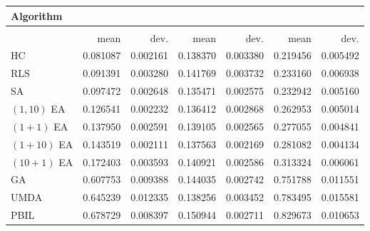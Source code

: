 \begin{tabular}{@{} l *{6}{>{{}}N{1}{2}} @{}}
\toprule
{Algorithm} &  \\
\midrule
&  &  &  \\
\midrule
& {mean} & {dev.} & {mean} & {dev.} & {mean} & {dev.} \\
\midrule
HC & 0.081087 & 0.002161 & 0.138370 & 0.003380 & 0.219456 & 0.005492 \\
RLS & 0.091391 & 0.003280 & 0.141769 & 0.003732 & 0.233160 & 0.006938 \\
SA & 0.097472 & 0.002648 & 0.135471 & 0.002575 & 0.232942 & 0.005160 \\
$(1,10)$ EA & 0.126541 & 0.002232 & 0.136412 & 0.002868 & 0.262953 & 0.005014 \\
$(1+1)$ EA & 0.137950 & 0.002591 & 0.139105 & 0.002565 & 0.277055 & 0.004841 \\
$(1+10)$ EA & 0.143519 & 0.002111 & 0.137563 & 0.002169 & 0.281082 & 0.004134 \\
$(10+1)$ EA & 0.172403 & 0.003593 & 0.140921 & 0.002586 & 0.313324 & 0.006061 \\
GA & 0.607753 & 0.009388 & 0.144035 & 0.002742 & 0.751788 & 0.011551 \\
UMDA & 0.645239 & 0.012335 & 0.138256 & 0.003452 & 0.783495 & 0.015581 \\
PBIL & 0.678729 & 0.008397 & 0.150944 & 0.002711 & 0.829673 & 0.010653 \\
\bottomrule
\end{tabular}
